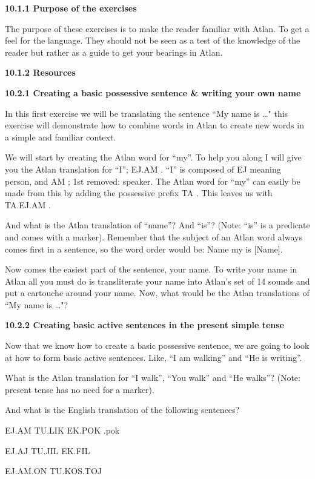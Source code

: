 
\noindent \textbf{10.1.1 Purpose of the exercises} 

The purpose of these exercises is to make the reader familiar with Atlan. To get a feel for the language. They should not be seen as a test of the knowledge of the reader but rather as a guide to get your bearings in Atlan.  

\noindent \textbf{10.1.2 Resources} 

\noindent \textbf{10.2.1 Creating a basic possessive sentence \& writing your own name} 

In this first exercise we will be translating the sentence “My name is …" this exercise will demonstrate how to combine words in Atlan to create new words in a simple and familiar context. 

We will start by creating the Atlan word for “my”. To help you along I will give you the Atlan translation for “I”; EJ.AM \ej\am. “I” is composed of EJ \ej meaning person, and AM \am; 1st removed: speaker. The Atlan word for “my” can easily be made from this by adding the possessive prefix TA \ta. This leaves us with TA.EJ.AM \ta\ej\am.  

And what is the Atlan translation of “name”? And “is”? (Note: “is” is a predicate and comes with a marker). Remember that the subject of an Atlan word always comes first in a sentence, so the word order would be: Name my is [Name]. 

Now comes the easiest part of the sentence, your name. To write your name in Atlan all you must do is transliterate your name into Atlan’s set of 14 sounds and put a cartouche around your name. Now, what would be the Atlan translations of “My name is …"? 

\noindent \textbf{10.2.2 Creating basic active sentences in the present simple tense} 

Now that we know how to create a basic possessive sentence, we are going to look at how to form basic active sentences. Like, “I am walking” and “He is writing”.  

What is the Atlan translation for “I walk”, “You walk” and “He walks”? (Note: present tense has no need for a marker).  

And what is the English translation of the following sentences? 

    EJ.AM TU.LIK EK.POK \ej\am \tu\lik \ek.pok  

    EJ.AJ TU.JIL EK.FIL\ej\aj \tu\jil \ek\fil  

    EJ.AM.ON TU.KOS.TOJ \ej\am\on \tu\kos\toj 

